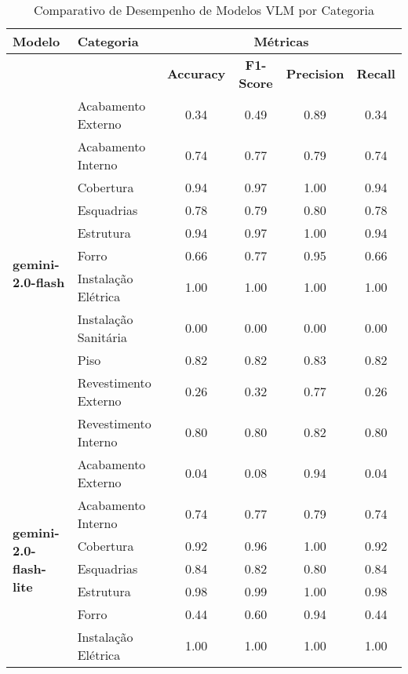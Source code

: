 \begin{table}[htbp]
  \centering
  \caption{Comparativo de Desempenho de Modelos VLM por Categoria}
  \label{tab:vlm_model_category_metrics_final}
  \
  \begin{tabular}{llcccc}
    \textbf{Modelo} & \textbf{Categoria} & \multicolumn{4}{c}{\textbf{Métricas}} \\
    \midrule
     &  & \textbf{Accuracy} & \textbf{F1-Score} & \textbf{Precision} & \textbf{Recall} \\
    \cmidrule(lr){3-6}
    \multirow{11}{*}{\textbf{gemini-2.0-flash}} & \multirow{1}{*}{Acabamento Externo} & 0.34 & 0.49 & 0.89 & 0.34 \\
     & \multirow{1}{*}{Acabamento Interno} & 0.74 & 0.77 & 0.79 & 0.74 \\
     & \multirow{1}{*}{Cobertura} & 0.94 & 0.97 & 1.00 & 0.94 \\
     & \multirow{1}{*}{Esquadrias} & 0.78 & 0.79 & 0.80 & 0.78 \\
     & \multirow{1}{*}{Estrutura} & 0.94 & 0.97 & 1.00 & 0.94 \\
     & \multirow{1}{*}{Forro} & 0.66 & 0.77 & 0.95 & 0.66 \\
     & \multirow{1}{*}{Instalação Elétrica} & 1.00 & 1.00 & 1.00 & 1.00 \\
     & \multirow{1}{*}{Instalação Sanitária} & 0.00 & 0.00 & 0.00 & 0.00 \\
     & \multirow{1}{*}{Piso} & 0.82 & 0.82 & 0.83 & 0.82 \\
     & \multirow{1}{*}{Revestimento Externo} & 0.26 & 0.32 & 0.77 & 0.26 \\
     & \multirow{1}{*}{Revestimento Interno} & 0.80 & 0.80 & 0.82 & 0.80 \\
    \midrule
    \multirow{11}{*}{\textbf{gemini-2.0-flash-lite}} & \multirow{1}{*}{Acabamento Externo} & 0.04 & 0.08 & 0.94 & 0.04 \\
     & \multirow{1}{*}{Acabamento Interno} & 0.74 & 0.77 & 0.79 & 0.74 \\
     & \multirow{1}{*}{Cobertura} & 0.92 & 0.96 & 1.00 & 0.92 \\
     & \multirow{1}{*}{Esquadrias} & 0.84 & 0.82 & 0.80 & 0.84 \\
     & \multirow{1}{*}{Estrutura} & 0.98 & 0.99 & 1.00 & 0.98 \\
     & \multirow{1}{*}{Forro} & 0.44 & 0.60 & 0.94 & 0.44 \\
     & \multirow{1}{*}{Instalação Elétrica} & 1.00 & 1.00 & 1.00 & 1.00 \\

\end{tabular}
\end{table}
